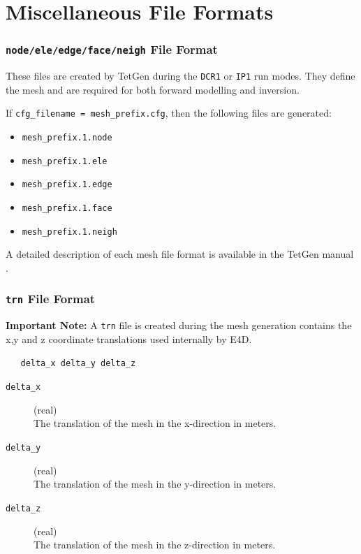 \documentclass[a4paper,12pt]{article}
\begin{document}
\section{Miscellaneous File Formats}

\subsubsection{\texttt{node/ele/edge/face/neigh} File Format} \label{mesh_files}

These files are created by TetGen during the \texttt{DCR1} or \texttt{IP1} run modes. They define the mesh and are required for both forward modelling and inversion.

If \texttt{cfg\_filename = mesh\_prefix.cfg}, then the following files are generated:

\begin{itemize}
    \item \texttt{mesh\_prefix.1.node}
    \item \texttt{mesh\_prefix.1.ele}
    \item \texttt{mesh\_prefix.1.edge}
    \item \texttt{mesh\_prefix.1.face}
    \item \texttt{mesh\_prefix.1.neigh}
\end{itemize}

A detailed description of each mesh file format is available in the TetGen manual \cite{10.1145/2629697}.



\subsubsection{\texttt{trn} File Format} \label{mesh_trn}

\begin{framed}
\noindent \textbf{Important Note:} A \texttt{trn} file is created during the mesh generation contains the x,y and z coordinate translations used internally by E4D.
\end{framed}

\begin{framed}
\begin{verbatim}
   delta_x delta_y delta_z
\end{verbatim}
\end{framed}

\begin{description}
    \item[\texttt{delta\_x}] (real)\hfill \\
    The translation of the mesh in the x-direction in meters.

    \item[\texttt{delta\_y}] (real)\hfill \\
    The translation of the mesh in the y-direction in meters.

    \item[\texttt{delta\_z}] (real)\hfill \\
    The translation of the mesh in the z-direction in meters.
\end{description}
\end{document}
